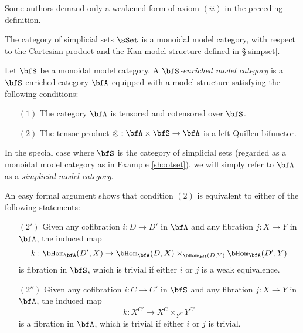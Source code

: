 \begin{remark}
Some authors demand only a weakened form of axiom $(ii)$ in the preceding definition.
\end{remark}

\begin{example}\label{shootset}
The category of simplicial sets $\sSet$ is a monoidal model category, with
respect to the Cartesian product and the Kan model structure defined in \S \ref{simpset}.
\end{example}

\begin{definition}
Let $\bfS$ be a monoidal model category. A {\it $\bfS$-enriched model category}
is a $\bfS$-enriched category $\bfA$ equipped with a model structure satisfying the following conditions:
\begin{itemize}
\item[$(1)$] The category $\bfA$ is tensored and cotensored over $\bfS$.
\item[$(2)$] The tensor product $\otimes: \bfA \times \bfS \rightarrow \bfA$ is a left Quillen bifunctor.
\end{itemize}
In the special case where $\bfS$ is the category of simplicial sets (regarded
as a monoidal model category as in Example \ref{shootset}), we will simply refer to
$\bfA$ as a {\it simplicial model category}.
\end{definition}

\begin{remark}\label{cyclor}
An easy formal argument shows that condition $(2)$ is equivalent to either of the following
statements:
\begin{itemize}
\item[$(2')$] Given any cofibration $i: D \rightarrow D'$ in $\bfA$ and any fibration
$j: X \rightarrow Y$ in $\bfA$, the induced map
$$k: \bHom_{\bfA}(D',X) \rightarrow \bHom_{\bfA}(D,X) \times_{ \bHom_{\bfA}(D,Y)} \bHom_{\bfA}(D',Y)$$ is fibration in $\bfS$, which is trivial if either $i$ or $j$ is a weak equivalence.
\item[$(2'')$] Given any cofibration $i: C \rightarrow C'$ in $\bfS$ and any fibration $j: X \rightarrow Y$ in $\bfA$, the induced map $$k: X^{C'} \rightarrow X^C \times_{ Y^C} Y^{C'}$$ is a fibration in $\bfA$, which is trivial if either $i$ or $j$ is trivial.
\end{itemize}
\end{remark}

